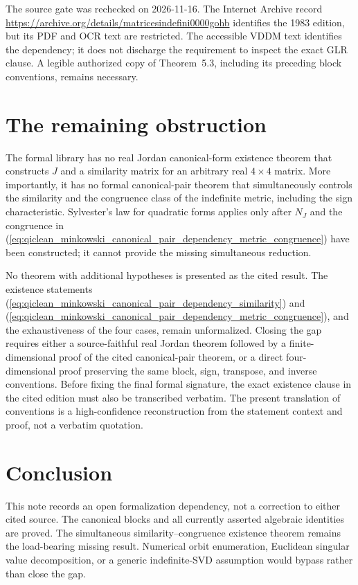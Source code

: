 \documentclass{article}
\begin{document}
The source gate was rechecked on 2026-11-16. The Internet Archive record
\url{https://archive.org/details/matricesindefini0000gohb} identifies the
1983 edition, but its PDF and OCR text are restricted. The accessible VDDM
text identifies the dependency; it does not discharge the requirement to
inspect the exact GLR clause. A legible authorized copy of Theorem~5.3,
including its preceding block conventions, remains necessary.

\section{The remaining obstruction}

The formal library has no real Jordan canonical-form existence theorem that
constructs $J$ and a similarity matrix for an arbitrary real $4\times4$
matrix. More importantly, it has no formal canonical-pair theorem that
simultaneously controls the similarity and the congruence class of the
indefinite metric, including the sign characteristic. Sylvester's law for
quadratic forms applies only after $N_J$ and the congruence in
(\ref{eq:qiclean_minkowski_canonical_pair_dependency_metric_congruence}) have
been constructed; it cannot provide the missing simultaneous reduction.

No theorem with additional hypotheses is presented as the cited result. The
existence statements
(\ref{eq:qiclean_minkowski_canonical_pair_dependency_similarity}) and
(\ref{eq:qiclean_minkowski_canonical_pair_dependency_metric_congruence}), and
the exhaustiveness of the four cases, remain unformalized. Closing the gap
requires either a source-faithful real Jordan theorem followed by a
finite-dimensional proof of the cited canonical-pair theorem, or a direct
four-dimensional proof preserving the same block, sign, transpose, and inverse
conventions. Before fixing the final formal signature, the exact existence
clause in the cited edition must also be transcribed verbatim. The present
translation of conventions is a high-confidence reconstruction from the
statement context and proof, not a verbatim quotation.

\section{Conclusion}

This note records an open formalization dependency, not a correction to either
cited source. The canonical blocks and all currently asserted algebraic
identities are proved. The simultaneous similarity--congruence existence
theorem remains the load-bearing missing result. Numerical orbit enumeration,
Euclidean singular value decomposition, or a generic indefinite-SVD assumption
would bypass rather than close the gap.
\end{document}

